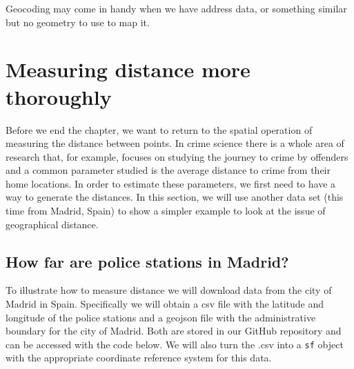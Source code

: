 \documentclass[
]{book}
\newenvironment{Shaded}{\begin{snugshade}}{\end{snugshade}}
\newcommand{\AttributeTok}[1]{\textcolor[rgb]{0.77,0.63,0.00}{#1}}
\newcommand{\CommentTok}[1]{\textcolor[rgb]{0.56,0.35,0.01}{\textit{#1}}}
\newcommand{\DecValTok}[1]{\textcolor[rgb]{0.00,0.00,0.81}{#1}}
\newcommand{\FunctionTok}[1]{\textcolor[rgb]{0.00,0.00,0.00}{#1}}
\newcommand{\NormalTok}[1]{#1}
\newcommand{\OtherTok}[1]{\textcolor[rgb]{0.56,0.35,0.01}{#1}}
\newcommand{\SpecialCharTok}[1]{\textcolor[rgb]{0.00,0.00,0.00}{#1}}
\newcommand{\StringTok}[1]{\textcolor[rgb]{0.31,0.60,0.02}{#1}}
\begin{document}
Geocoding may come in handy when we have address data, or something similar but no geometry to use to map it.

\hypertarget{measuring-distance-more-thoroughly}{%
\section{Measuring distance more thoroughly}\label{measuring-distance-more-thoroughly}}

Before we end the chapter, we want to return to the spatial operation of measuring the distance between points. In crime science there is a whole area of research that, for example, focuses on studying the journey to crime by offenders and a common parameter studied is the average distance to crime from their home locations. In order to estimate these parameters, we first need to have a way to generate the distances. In this section, we will use another data set (this time from Madrid, Spain) to show a simpler example to look at the issue of geographical distance.

\hypertarget{how-far-are-police-stations-in-madrid}{%
\subsection{How far are police stations in Madrid?}\label{how-far-are-police-stations-in-madrid}}

To illustrate how to measure distance we will download data from the city of Madrid in Spain. Specifically we will obtain a csv file with the latitude and longitude of the police stations and a geojson file with the administrative boundary for the city of Madrid. Both are stored in our GitHub repository and can be accessed with the code below. We will also turn the .csv into a \texttt{sf} object with the appropriate coordinate reference system for this data.

\begin{Shaded}
\end{Shaded}
\end{document}

